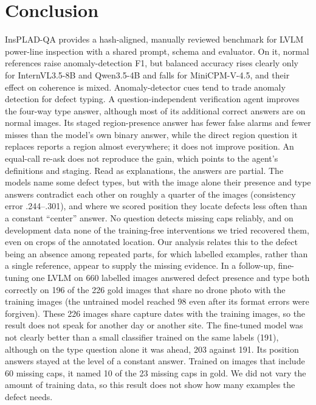 \documentclass[11pt]{article}
\begin{document}
\section{Conclusion}
InsPLAD-QA provides a hash-aligned, manually reviewed benchmark for LVLM power-line inspection with a shared prompt, schema and evaluator. On it, normal references raise anomaly-detection F1, but balanced accuracy rises clearly only for InternVL3.5-8B and Qwen3.5-4B and falls for MiniCPM-V-4.5, and their effect on coherence is mixed. Anomaly-detector cues tend to trade anomaly detection for defect typing. A question-independent verification agent improves the four-way type answer, although most of its additional correct answers are on normal images. Its staged region-presence answer has fewer false alarms and fewer misses than the model's own binary answer, while the direct region question it replaces reports a region almost everywhere; it does not improve position. An equal-call re-ask does not reproduce the gain, which points to the agent's definitions and staging. Read as explanations, the answers are partial. The models name some defect types, but with the image alone their presence and type answers contradict each other on roughly a quarter of the images (consistency error .244--.301), and where we scored position they locate defects less often than a constant ``center'' answer. No question detects missing caps reliably, and on development data none of the training-free interventions we tried recovered them, even on crops of the annotated location. Our analysis relates this to the defect being an absence among repeated parts, for which labelled examples, rather than a single reference, appear to supply the missing evidence. In a follow-up, fine-tuning one LVLM on 660 labelled images answered defect presence and type both correctly on 196 of the 226 gold images that share no drone photo with the training images (the untrained model reached 98 even after its format errors were forgiven). These 226 images share capture dates with the training images, so the result does not speak for another day or another site. The fine-tuned model was not clearly better than a small classifier trained on the same labels (191), although on the type question alone it was ahead, 203 against 191. Its position answers stayed at the level of a constant answer. Trained on images that include 60 missing caps, it named 10 of the 23 missing caps in gold. We did not vary the amount of training data, so this result does not show how many examples the defect needs.
\end{document}
